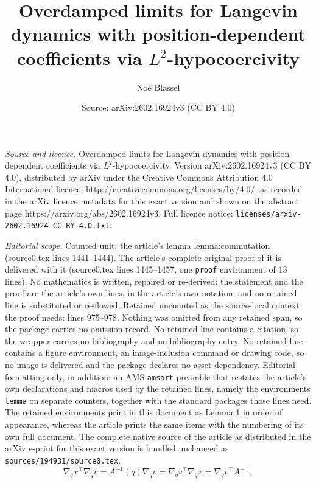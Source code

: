 \documentclass[10pt,a4paper]{amsart}
\title{Overdamped limits for Langevin dynamics with position-dependent coefficients via $L^2$-hypocoercivity}
\author{No\'e Blassel}
\date{Source: arXiv:2602.16924v3 (CC BY 4.0)}
\begin{document}
\maketitle

\noindent\emph{Source and licence.} Overdamped limits for Langevin dynamics with position-dependent coefficients via $L^2$-hypocoercivity. Version arXiv:2602.16924v3 (CC BY 4.0), distributed by arXiv under the Creative Commons Attribution 4.0 International licence, http://creativecommons.org/licenses/by/4.0/, as recorded in the arXiv licence metadata for this exact version and shown on the abstract page https://arxiv.org/abs/2602.16924v3. Full licence notice: \texttt{licenses/arxiv-2602.16924-CC-BY-4.0.txt}.\par\smallskip

\noindent\textit{Editorial scope.} Counted unit: the article's lemma lemma:commutation (source0.tex lines 1441--1444). The article's complete original proof of it is delivered with it (source0.tex lines 1445--1457, one \texttt{proof} environment of 13 lines). No mathematics is written, repaired or re-derived: the statement and the proof are the article's own lines, in the article's own notation, and no retained line is substituted or re-flowed.  Retained uncounted as the source-local context the proof needs: lines 975--978.  Nothing was omitted from any retained span, so the package carries no omission record.  No retained line contains a citation, so the wrapper carries no bibliography and no bibliography entry.  No retained line contains a figure environment, an image-inclusion command or drawing code, so no image is delivered and the package declares no asset dependency.  Editorial formatting only, in addition: an AMS \texttt{amsart} preamble that restates the article's own declarations and macros used by the retained lines, namely the environments \texttt{lemma} on separate counters, together with the standard packages those lines need.  The retained environments print in this document as Lemma 1 in order of appearance, whereas the article prints the same items with the numbering of its own full document.  The complete native source of the article as distributed in the arXiv e-print for this exact version is bundled unchanged as \texttt{sources/194931/source0.tex}.
\begin{equation}
    \label{eq:symmetry_condition}
\nabla_q x^\top \nabla_q v = A^{-1}(q)\nabla_q v = \nabla_q v^\top \nabla_q x = \nabla_q v^\top A^{-\top},
\end{equation}
\end{document}
